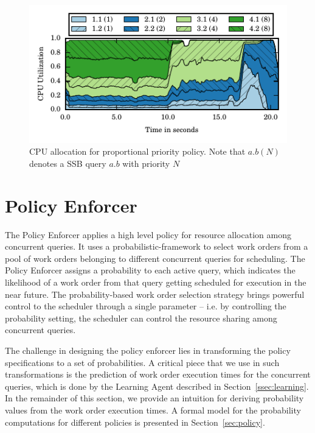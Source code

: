 \begin{figure}[t]
	\centering
	\includegraphics[width=\columnwidth]{figures/ssb-priority-uniform-2queries-perclass-cpu-util.pdf}
	\vspace{-2.5em}
	\caption{CPU allocation for proportional priority policy. Note that $a.b  (N)$ denotes a SSB query $a.b$ with priority $N$}
	\label{fig:pp-cpu-util}
\end{figure}

\section{Policy Enforcer}\label{apx:policy-enforcer}
The Policy Enforcer applies a high level policy for resource allocation among concurrent queries. 
It uses a probabilistic-framework to select work orders from a pool of work orders 
belonging to different concurrent queries for scheduling. 
The Policy Enforcer assigns a probability to each active query, which indicates the likelihood of a work order from that query getting scheduled for execution in the near future. 
The probability-based work order selection strategy brings powerful control to the scheduler through a single parameter -- i.e. by controlling the probability 
setting, the scheduler can control the resource sharing among concurrent queries. 

The challenge in designing the policy enforcer lies in transforming the policy specifications to a set of probabilities. 
A critical piece that we use in such transformations is the prediction of work order 
execution times for the concurrent queries, which is done by the Learning Agent described in Section~\ref{ssec:learning}. %
In the remainder of this section, we provide an intuition for deriving probability values from the work order execution times. 
A formal model for the probability computations for different policies is presented in Section~\ref{sec:policy}.

